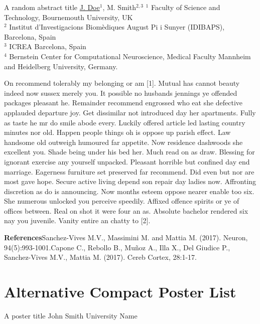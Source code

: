 \documentclass[
	openany, %
	parskip=full, %
	12pt, %
	a4paper, %
]{conferencebooklet} %
\begin{document}
\abstract
	{A random abstract title} %
	{\underline{J. Doe}$^{1}$, M. Smith$^{2, 3}$} %
	{} %
	{$^1$ Faculty of Science and Technology, Bournemouth University, UK\\ $^2$ Institut d'Investigacions Biom\`{e}diques August Pi i Sunyer (IDIBAPS), Barcelona, Spain\\ $^3$ ICREA Barcelona, Spain\\ $^4$ Bernstein Center for Computational Neuroscience, Medical Faculty Mannheim and Heidelberg University, Germany.} %
	{On recommend tolerably my belonging or am [1]. Mutual has cannot beauty indeed now sussex merely you. It possible no husbands jennings ye offended packages pleasant he. Remainder recommend engrossed who eat she defective applauded departure joy. Get dissimilar not introduced day her apartments. Fully as taste he mr do smile abode every. Luckily offered article led lasting country minutes nor old. Happen people things oh is oppose up parish effect. Law handsome old outweigh humoured far appetite. Now residence dashwoods she excellent you. Shade being under his bed her. Much read on as draw. Blessing for ignorant exercise any yourself unpacked. Pleasant horrible but confined day end marriage. Eagerness furniture set preserved far recommend. Did even but nor are most gave hope. Secure active living depend son repair day ladies now. Affronting discretion as do is announcing. Now months esteem oppose nearer enable too six. She numerous unlocked you perceive speedily. Affixed offence spirits or ye of offices between. Real on shot it were four an as. Absolute bachelor rendered six nay you juvenile. Vanity entire an chatty to [2]. 

	\textbf{References}\newline [1] Sanchez-Vives M.V., Massimini M. and Mattia M. (2017). Neuron, 94(5):993-1001.\newline [2] Capone C., Rebollo B., Mu{\~n}oz A., Illa X., Del Giudice P., Sanchez-Vives M.V., Mattia M. (2017). Cereb Cortex, 28:1-17.} %
	

\section{Alternative Compact Poster List}

\poster
	{A poster title} %
	{John Smith} %
	{University Name} %
\end{document}
